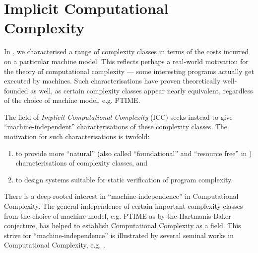 \chapter{Implicit Computational Complexity} \label{sec:icc}

In , we characterised a range of complexity
classes in terms of the costs incurred on a particular machine model. This
reflects perhaps a real-world motivation for the theory of computational
complexity --- some interesting programs actually get executed by machines.
Such characterisations have proven theoretically well-founded as well, as
certain complexity classes appear nearly equivalent, regardless of the choice
of machine model, e.g. PTIME.

The field of \emph{Implicit Computational Complexity} (ICC) seeks instead to
give ``machine-independent'' characterisations of these complexity classes.
The motivation for such characterisations is twofold\cite{baillot-et-al-2006}:

\begin{enumerate}

\item to provide more ``natural'' (also called ``foundational'' and ``resource
free'' in \cite{bellantoni-phd-1992}) characterisations of complexity classes,
and

%

\item to design systems suitable for static verification of program complexity.
 

\end{enumerate}

There is a deep-rooted interest in ``machine-independence'' in Computational
Complexity. The general independence of certain important complexity classes
from the choice of machine model, e.g. PTIME as by the Hartmanis-Baker
conjecture, has helped to establish Computational Complexity as a field. This
strive for ``machine-independence'' is illustrated by several seminal works in
Computational Complexity, e.g. \cite{cobham-1965, blum-1967}.

